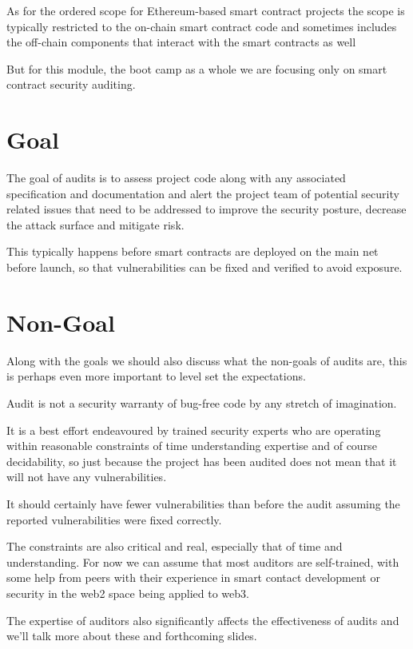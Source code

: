 As for the ordered scope for Ethereum-based smart contract projects the scope is typically restricted to the on-chain smart contract code and sometimes includes the off-chain components that interact with the smart contracts as well

But for this module, the boot camp as a whole we are focusing only on smart contract security auditing.

\section{Goal}

The goal of audits is to assess project code along with any associated specification and documentation and alert the project team of potential security related issues that need to be addressed to improve the security posture, decrease the attack surface and mitigate risk.

This typically happens before smart contracts are deployed on the main net before launch, so that vulnerabilities can be fixed and verified to avoid exposure.

\section{Non-Goal}

Along with the goals we should also discuss what the non-goals of audits are, this is perhaps even more important to level set the expectations.

Audit is not a security warranty of bug-free code by any stretch of imagination. 

It is a best effort endeavoured by trained security experts who are operating within reasonable constraints of time understanding expertise and of course decidability, so just because the project has been audited does not mean that it will not have any vulnerabilities. 

It should certainly have fewer vulnerabilities than before the audit assuming the reported vulnerabilities were fixed correctly. 

The constraints are also critical and real, especially that of time and understanding. For now we can assume that most auditors are self-trained, with some help from peers with their experience in smart contact development or security in the web2 space being applied to web3. 

The expertise of auditors also significantly affects the effectiveness of audits and we'll talk more about these and forthcoming slides.

